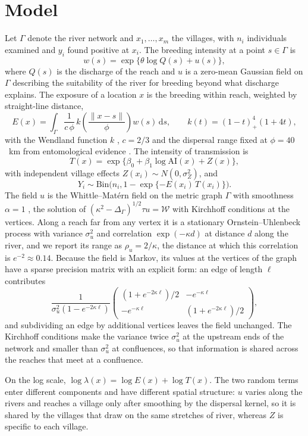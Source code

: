 \documentclass[11pt,a4paper]{article}
\newcommand{\Bin}{\mathrm{Bin}}
\newcommand{\dd}{\mathrm{d}}
\newcommand{\AI}{\mathrm{AI}}
\begin{document}
\section{Model}

Let $\Gamma$ denote the river network and $x_1, \dots, x_m$ the villages, with $n_i$ individuals examined and $y_i$ found positive at $x_i$. The breeding intensity at a point $s \in \Gamma$ is
\[
w(s) = \exp\{\theta \log Q(s) + u(s)\},
\]
where $Q(s)$ is the discharge of the reach and $u$ is a zero-mean Gaussian field on $\Gamma$ describing the suitability of the river for breeding beyond what discharge explains. The exposure of a location $x$ is the breeding within reach, weighted by straight-line distance,
\[
E(x) = \int_\Gamma \frac{1}{c\,\phi}\, k\!\left(\frac{\lVert x - s\rVert}{\phi}\right) w(s)\, \dd s, \qquad k(t) = (1 - t)_+^4(1 + 4t),
\]
with the Wendland function $k$ \citep{wendland1995}, $c = 2/3$ and the dispersal range fixed at $\phi = 40$~km from entomological evidence \citep{carnaghi2024}. The intensity of transmission is
\[
T(x) = \exp\{\beta_0 + \beta_1 \log \AI(x) + Z(x)\},
\]
with independent village effects $Z(x_i) \sim N(0, \sigma_Z^2)$, and
\[
Y_i \sim \Bin\big(n_i, 1 - \exp\{-E(x_i)\,T(x_i)\}\big).
\]
The field $u$ is the Whittle--Mat\'ern field on the metric graph $\Gamma$ with smoothness $\alpha = 1$ \citep{bolin2024}, the solution of $(\kappa^2 - \Delta_\Gamma)^{1/2}\tau u = \mathcal{W}$ with Kirchhoff conditions at the vertices. Along a reach far from any vertex it is a stationary Ornstein--Uhlenbeck process with variance $\sigma_u^2$ and correlation $\exp(-\kappa d)$ at distance $d$ along the river, and we report its range as $\rho_u = 2/\kappa$, the distance at which this correlation is $e^{-2} \approx 0.14$. Because the field is Markov, its values at the vertices of the graph have a sparse precision matrix with an explicit form: an edge of length $\ell$ contributes
\[
\frac{1}{\sigma_u^2(1 - e^{-2\kappa\ell})}\begin{pmatrix} (1 + e^{-2\kappa\ell})/2 & -e^{-\kappa\ell} \\ -e^{-\kappa\ell} & (1 + e^{-2\kappa\ell})/2 \end{pmatrix},
\]
and subdividing an edge by additional vertices leaves the field unchanged. The Kirchhoff conditions make the variance twice $\sigma_u^2$ at the upstream ends of the network and smaller than $\sigma_u^2$ at confluences, so that information is shared across the reaches that meet at a confluence.

On the log scale, $\log\lambda(x) = \log E(x) + \log T(x)$. The two random terms enter different components and have different spatial structure: $u$ varies along the rivers and reaches a village only after smoothing by the dispersal kernel, so it is shared by the villages that draw on the same stretches of river, whereas $Z$ is specific to each village.
\end{document}
